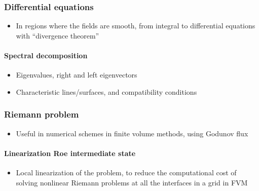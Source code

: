 \documentclass[letterpaper,10pt,english]{jupyterBook}
\begin{document}
\subsubsection{Differential equations}
\label{\detokenize{ch/pde/hyperbolic-nd-shallow-water:differential-equations}}\label{\detokenize{ch/pde/hyperbolic-nd-shallow-water:pde-hyperbolic-nd-shallow-water-differential}}\begin{itemize}
\item {} 
\sphinxAtStartPar
In regions where the fields are smooth, from integral to differential equations with “divergence theorem”

\end{itemize}


\paragraph{Spectral decomposition}
\label{\detokenize{ch/pde/hyperbolic-nd-shallow-water:spectral-decomposition}}\label{\detokenize{ch/pde/hyperbolic-nd-shallow-water:pde-hyperbolic-nd-shallow-water-differential-spectrum}}\begin{itemize}
\item {} 
\sphinxAtStartPar
Eigenvalues, right and left eigenvectors

\item {} 
\sphinxAtStartPar
Characteristic lines/surfaces, and compatibility conditions

\end{itemize}


\subsubsection{Riemann problem}
\label{\detokenize{ch/pde/hyperbolic-nd-shallow-water:riemann-problem}}\label{\detokenize{ch/pde/hyperbolic-nd-shallow-water:pde-hyperbolic-nd-shallow-water-riemann}}\begin{itemize}
\item {} 
\sphinxAtStartPar
Useful in numerical schemes in finite volume methods, using Godunov flux

\end{itemize}


\paragraph{Linearization \sphinxhyphen{} Roe intermediate state}
\label{\detokenize{ch/pde/hyperbolic-nd-shallow-water:linearization-roe-intermediate-state}}\label{\detokenize{ch/pde/hyperbolic-nd-shallow-water:pde-hyperbolic-nd-shallow-water-riemann-roe}}\begin{itemize}
\item {} 
\sphinxAtStartPar
Local linearization of the problem, to reduce the computational cost of solving non\sphinxhyphen{}linear Riemann problems at all the interfaces in a grid in FVM

\end{itemize}
\end{document}

